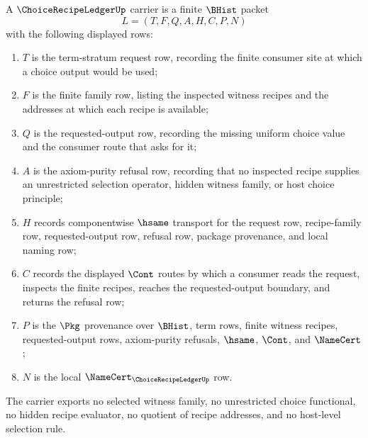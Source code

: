 \begin{definition}
\label{def:choice-recipe-ledger-carrier}
A $\ChoiceRecipeLedgerUp$ carrier is a finite $\BHist$ packet
$$
L=(T,F,Q,A,H,C,P,N)
$$
with the following displayed rows:
\begin{enumerate}
\item $T$ is the term-stratum request row, recording the finite consumer site at which a choice output would be used;
\item $F$ is the finite family row, listing the inspected witness recipes and the addresses at which each recipe is available;
\item $Q$ is the requested-output row, recording the missing uniform choice value and the consumer route that asks for it;
\item $A$ is the axiom-purity refusal row, recording that no inspected recipe supplies an unrestricted selection operator, hidden witness family, or host choice principle;
\item $H$ records componentwise $\hsame$ transport for the request row, recipe-family row, requested-output row, refusal row, package provenance, and local naming row;
\item $C$ records the displayed $\Cont$ routes by which a consumer reads the request, inspects the finite recipes, reaches the requested-output boundary, and returns the refusal row;
\item $P$ is the $\Pkg$ provenance over $\BHist$, term rows, finite witness recipes, requested-output rows, axiom-purity refusals, $\hsame$, $\Cont$, and $\NameCert$;
\item $N$ is the local $\NameCert_{\ChoiceRecipeLedgerUp}$ row.
\end{enumerate}
The carrier exports no selected witness family, no unrestricted choice functional, no hidden recipe evaluator, no quotient of recipe addresses, and no host-level selection rule.
\end{definition}

